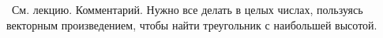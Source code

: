 \indent\indent\
См. лекцию.
Комментарий. Нужно все делать в целых числах, пользуясь векторным
произведением, чтобы найти треугольник с наибольшей высотой.

